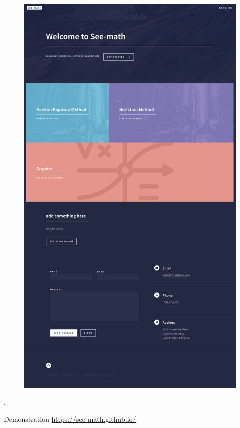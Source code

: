 \documentclass[12pt]{beamer}
\begin{document}
\begin{frame}{}
\begin{minipage}{0.7\linewidth}
\begin{figure}
	\includegraphics[width=0.95\linewidth]{seemath1}
	\label{fig:seemath1}
\end{figure}
\end{minipage}
\end{frame}
	.
	
	

	
	\begin{frame}{Demonstration}
		\url{https://see-math.github.io/}
	\end{frame}
\end{document}

